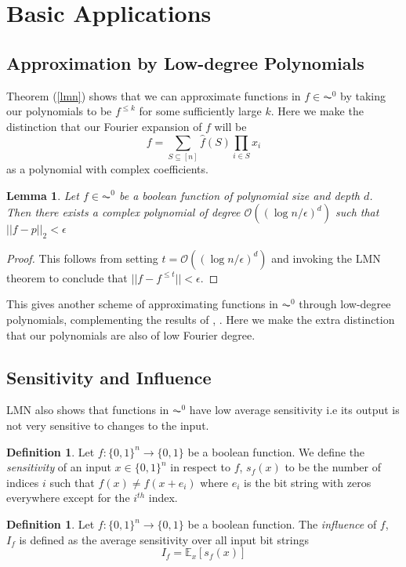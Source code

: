 \documentclass{amsart}
\newtheorem{lemma}[theorem]{Lemma}
\theoremstyle{definition}
\newtheorem{definition}[theorem]{Definition}
\theoremstyle{remark}
\numberwithin{equation}{section}
\theoremstyle{remark}
\begin{document}
\section{Basic Applications}

\subsection{Approximation by Low-degree Polynomials}
 Theorem (\ref{lmn}) shows that we can approximate functions in $f \in \AC^0$ by taking our polynomials to be $f^{\leq k}$ for some sufficiently large $k$. Here we make the distinction that our Fourier expansion of $f$ will be
$$f = \sum_{S \subseteq [n]} \hat{f}(S) \prod_{i \in S} x_i $$ as a polynomial with complex coefficients.
\begin{lemma}
  Let $f \in \AC^0$ be a boolean function of polynomial size and depth $d$. Then there exists a complex polynomial of degree $\mathcal{O}((\log{n/\epsilon})^d)$ such that $||f - p ||_2 < \epsilon$
\end{lemma}
%
\begin{proof}
This follows from setting $t = \mathcal{O}((\log{n/\epsilon})^d)$ and invoking the LMN theorem to conclude that $||f - f^{\leq t}|| < \epsilon$.
\end{proof}
%
This gives another scheme of approximating functions in $\AC^0$ through low-degree polynomials, complementing the results of \cite{razborov}, \cite{smolensky}. Here we make the extra distinction that our polynomials are also of low Fourier degree.

\subsection{Sensitivity and Influence}
LMN also shows that functions in $\AC^0$ have low average sensitivity i.e its output is not very sensitive to changes to the input.

\begin{definition}
  Let $f: \{0,1\}^n \rightarrow \{0,1\}$ be a boolean function. We define the \emph{sensitivity} of an input $x\in \{0,1\}^n$ in respect to $f$, $s_f(x)$ to be the number of indices $i$ such that $f(x) \neq f(x + e_i)$ where $e_i$ is the bit string with zeros everywhere except for the $i^{th}$ index.
\end{definition}

\begin{definition}
  Let $f: \{0,1\}^n \rightarrow \{0,1\}$ be a boolean function. The \emph{influence} of $f$, $I_f$ is defined as the average sensitivity over all input bit strings
  \begin{equation}
    I_f = \mathbb{E}_x[s_f(x)]
  \end{equation}
\end{definition}
\end{document}

